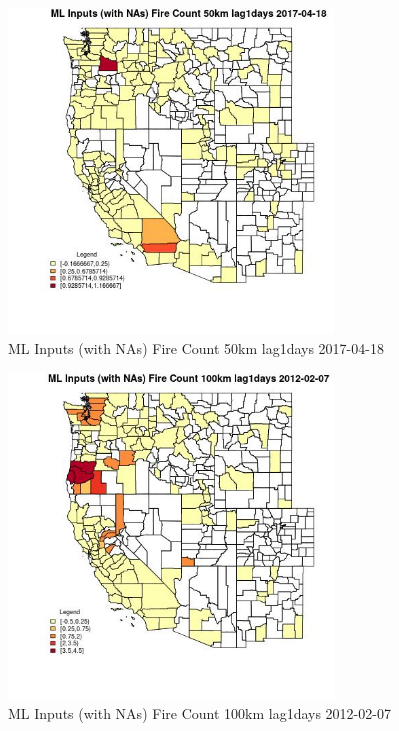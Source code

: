 \begin{figure} 
\centering  
\includegraphics[width=0.77\textwidth]{Code_Outputs/Report_ML_input_PM25_Step4_part_f_de_duplicated_aves_prioritize_24hr_obswNAs_CountyFire_Count_50km_lag1daysMean2017-04-18.jpg} 
\caption{\label{fig:Report_ML_input_PM25_Step4_part_f_de_duplicated_aves_prioritize_24hr_obswNAsCountyFire_Count_50km_lag1daysMean2017-04-18}ML Inputs (with NAs) Fire Count 50km lag1days 2017-04-18} 
\end{figure} 
 

\begin{figure} 
\centering  
\includegraphics[width=0.77\textwidth]{Code_Outputs/Report_ML_input_PM25_Step4_part_f_de_duplicated_aves_prioritize_24hr_obswNAs_CountyFire_Count_100km_lag1daysMean2012-02-07.jpg} 
\caption{\label{fig:Report_ML_input_PM25_Step4_part_f_de_duplicated_aves_prioritize_24hr_obswNAsCountyFire_Count_100km_lag1daysMean2012-02-07}ML Inputs (with NAs) Fire Count 100km lag1days 2012-02-07} 
\end{figure} 
 


